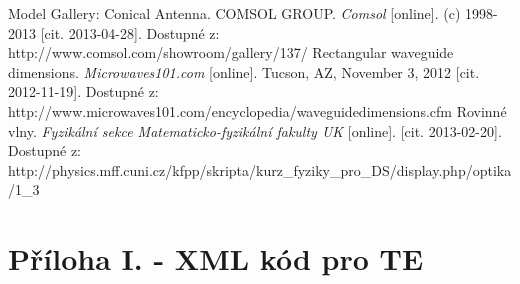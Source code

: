 \documentclass[12pt,a4paper,oneside]{article}
\numberwithin{equation}{section} %
\numberwithin{figure}{section} %
\numberwithin{table}{section} %
\begin{document}
\begin{thebibliography}{10}
 Model Gallery: Conical Antenna. COMSOL GROUP. \textit{Comsol} [online]. (c) 1998-2013 [cit. 2013-04-28]. Dostupné z: http://www.comsol.com/showroom/gallery/137/
 Rectangular waveguide dimensions. \textit{Microwaves101.com} [online]. Tucson, AZ, November 3, 2012 [cit. 2012-11-19]. Dostupné z: http://www.microwaves101.com/encyclopedia/waveguidedimensions.cfm
 Rovinné vlny. \textit{Fyzikální sekce Matematicko-fyzikální fakulty UK} [online]. [cit. 2013-02-20]. Dostupné z: http://physics.mff.cuni.cz/kfpp/skripta/kurz\_fyziky\_pro\_DS/display.php/optika/1\_3


\end{thebibliography}

\newpage
{} %
\setlength{\parskip}{0ex}%
\listoffigures

\newpage
{} %
\listoftables

\newpage
\pagestyle{empty} %
\setcounter{page}{1} %
\appendix %
\section*{Příloha I. - XML kód pro TE}
\end{document}
